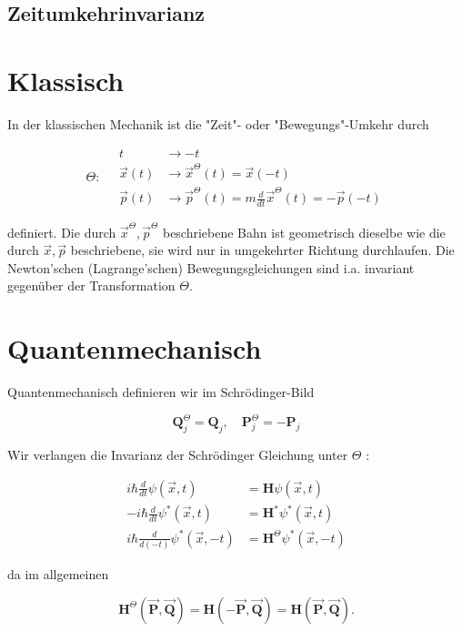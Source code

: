 \documentclass[10pt, letterpaper]{article}
\begin{document}
\subsection*{Zeitumkehrinvarianz}
\section*{Klassisch}
In der klassischen Mechanik ist die "Zeit"- oder "Bewegungs"-Umkehr durch

$$
\Theta: \quad \begin{aligned}
t & \rightarrow-t \\
\vec{x}(t) & \rightarrow \vec{x}^{\Theta}(t)=\vec{x}(-t) \\
\vec{p}(t) & \rightarrow \vec{p}^{\Theta}(t)=m \frac{d}{d t} \vec{x}^{\Theta}(t)=-\vec{p}(-t)
\end{aligned}
$$

definiert. Die durch $\vec{x}^{\Theta}, \vec{p}^{\Theta}$ beschriebene Bahn ist geometrisch dieselbe wie die durch $\vec{x}, \vec{p}$ beschriebene, sie wird nur in umgekehrter Richtung durchlaufen. Die Newton'schen (Lagrange'schen) Bewegungsgleichungen sind i.a. invariant gegenüber der Transformation $\Theta$.

\section*{Quantenmechanisch}
Quantenmechanisch definieren wir im Schrödinger-Bild

$$
\mathbf{Q}_{j}^{\Theta}=\mathbf{Q}_{j}, \quad \mathbf{P}_{j}^{\Theta}=-\mathbf{P}_{j}
$$

Wir verlangen die Invarianz der Schrödinger Gleichung unter $\Theta$ :

$$
\begin{aligned}
i \hbar \frac{d}{d t} \psi(\vec{x}, t) & =\mathbf{H} \psi(\vec{x}, t) \\
-i \hbar \frac{d}{d t} \psi^{*}(\vec{x}, t) & =\mathbf{H}^{*} \psi^{*}(\vec{x}, t) \\
i \hbar \frac{d}{d(-t)} \psi^{*}(\vec{x},-t) & =\mathbf{H}^{\Theta} \psi^{*}(\vec{x},-t)
\end{aligned}
$$

da im allgemeinen

$$
\mathbf{H}^{\Theta}(\overrightarrow{\mathbf{P}}, \overrightarrow{\mathbf{Q}})=\mathbf{H}(-\overrightarrow{\mathbf{P}}, \overrightarrow{\mathbf{Q}})=\mathbf{H}(\overrightarrow{\mathbf{P}}, \overrightarrow{\mathbf{Q}}) .
$$
\end{document}

